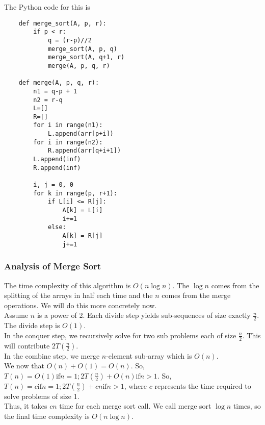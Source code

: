 \documentclass[]{article}
\begin{document}
The Python code for this is 
\begin{lstlisting}
	def merge_sort(A, p, r):
		if p < r:
			q = (r-p)//2
			merge_sort(A, p, q)
			merge_sort(A, q+1, r)
			merge(A, p, q, r)
			
	def merge(A, p, q, r):
		n1 = q-p + 1
		n2 = r-q
		L=[]
		R=[]
		for i in range(n1):
			L.append(arr[p+i])
		for i in range(n2):
			R.append(arr[q+i+1])
		L.append(inf)
		R.append(inf)
		
		i, j = 0, 0
		for k in range(p, r+1):
			if L[i] <= R[j]:
				A[k] = L[i]
				i+=1
			else:
				A[k] = R[j]
				j+=1
\end{lstlisting}\bigbreak

\subsubsection{Analysis of Merge Sort}\bigbreak

The time complexity of this algorithm is $O(n\log n)$. The $\log n$ comes from the splitting of the arrays in half each time and the $n$ comes from the merge operations. We will do this more concretely now.\\

Assume $n$ is a power of 2. Each divide step yields sub-sequences of size exactly $\frac{n}{2}$. The divide step is $O(1)$. \\

In the conquer step, we recursively solve for two sub problems each of size $\frac{n}{2}$. This will contribute $2T(\frac{n}{2})$.\\

In the combine step, we merge $n$-element sub-array which is $O(n)$.\\

We now that $O(n) + O(1) = O(n)$. So, $T(n) = O(1) \text{if} n=1; 2T(\frac{n}{2}) + O(n) \text{if} n > 1$. So, $T(n) = c \text{if} n=1; 2T(\frac{n}{2}) + cn \text{if} n > 1$, where $c$ represents the time required to solve problems of size 1. \\

Thus, it takes $cn$ time for each merge sort call. We call merge sort $\log n$ times, so the final time complexity is $O(n \log n)$.\\
\end{document}
